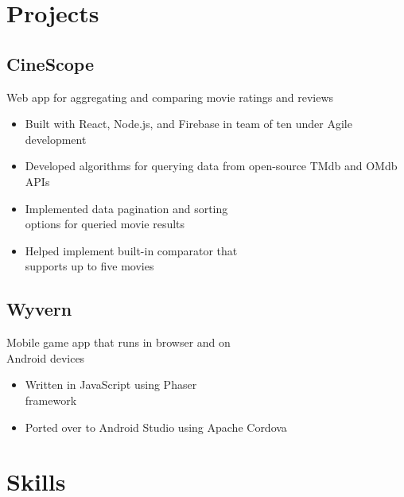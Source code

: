 \documentclass{article}
\begin{document}
\setlength{\columnsep}{1.5cm} %
\setlength{\columnseprule}{0.2pt} %
\begin{paracol}{2} %

\vspace{-2em}
\section{Projects}

\vspace{-0.5em}
\subsection{CineScope} \hfill

{\color{NavyBlue} Web app for aggregating and comparing movie \indent ratings and reviews}
\begin{itemize}
	\item Built with React, Node.js, and Firebase in team of ten under Agile development
	\item Developed algorithms for querying data from open-source TMdb and OMdb APIs
	\item Implemented data pagination and sorting\\options for queried movie results
	\item Helped implement built-in comparator that\\supports up to five movies
\end{itemize}

\subsection{Wyvern} \hfill

{\color{NavyBlue} Mobile game app that runs in browser and on \\\indent Android devices}
\begin{itemize}
	\item Written in JavaScript using Phaser\\framework
	\item Ported over to Android Studio using Apache Cordova
\end{itemize}

\switchcolumn
\vspace{-2em}
\section{Skills}


\end{paracol}
\end{document}
